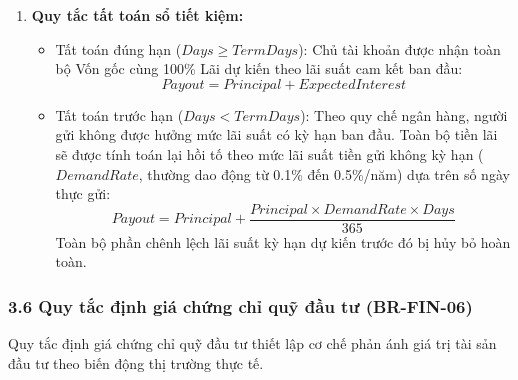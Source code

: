 \documentclass[11pt,a4paper]{article}
\providecommand{\tightlist}{
  \setlength{\itemsep}{0pt}\setlength{\parskip}{0pt}}
\begin{document}
\begin{enumerate}
  \begin{itemize}
  \tightlist
  \item
    Tiến độ thời gian của kỳ hạn (\(Process\)) được xác định:
    \[Process = \min\left(1.0, \frac{Days}{TermDays}\right)\]
  \item
    Lãi dự kiến toàn kỳ (\(ExpectedInterest\)):
    \[ExpectedInterest = \frac{Principal \times Rate \times TermDays}{365}\]
  \item
    Giá trị sổ tiết kiệm ghi nhận tại thời điểm quan sát (\(Balance\)):
    \[Balance = Principal + (ExpectedInterest \times Process)\]
  \end{itemize}
\item
  \textbf{Quy tắc tất toán sổ tiết kiệm:}

  \begin{itemize}
  \tightlist
  \item
    Tất toán đúng hạn (\(Days \ge TermDays\)): Chủ tài khoản được nhận
    toàn bộ Vốn gốc cùng 100\% Lãi dự kiến theo lãi suất cam kết ban
    đầu: \[Payout = Principal + ExpectedInterest\]
  \item
    Tất toán trước hạn (\(Days < TermDays\)): Theo quy chế ngân hàng,
    người gửi không được hưởng mức lãi suất có kỳ hạn ban đầu. Toàn bộ
    tiền lãi sẽ được tính toán lại hồi tố theo mức lãi suất tiền gửi
    không kỳ hạn (\(DemandRate\), thường dao động từ 0.1\% đến
    0.5\%/năm) dựa trên số ngày thực gửi:
    \[Payout = Principal + \frac{Principal \times DemandRate \times Days}{365}\]
    Toàn bộ phần chênh lệch lãi suất kỳ hạn dự kiến trước đó bị hủy bỏ
    hoàn toàn.
  \end{itemize}
\end{enumerate}

\subsubsection{3.6 Quy tắc định giá chứng chỉ quỹ đầu tư
(BR-FIN-06)}\label{36-quy-tux1eafc-ux111ux1ecbnh-giuxe1-chux1ee9ng-chux1ec9-quux1ef9-ux111ux1ea7u-tux1b0-br-fin-06}

Quy tắc định giá chứng chỉ quỹ đầu tư thiết lập cơ chế phản ánh giá trị
tài sản đầu tư theo biến động thị trường thực tế.
\end{document}

